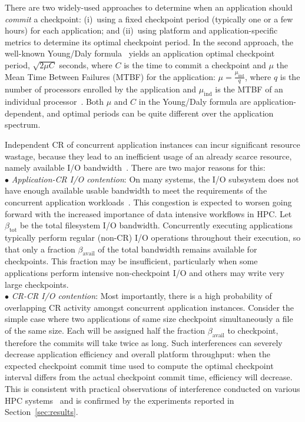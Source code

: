 \documentclass[conference,nofonttune]{IEEEtran}
\newcommand{\muind}{\mu_{\text{ind}}}
\newcommand{\bandtotal}{\beta_{\text{tot}}}
\newcommand{\bandavail}{\beta_{\text{avail}}}
\begin{document}
There are two widely-used approaches to determine when an application should
\emph{commit} a checkpoint: (i)~using a fixed checkpoint period (typically one
or a few hours) for each application; and (ii)~using platform and
application-specific metrics to determine its optimal checkpoint period. In the
second approach, the well-known Young/Daly formula~\cite{young74,daly04} yields
an application optimal checkpoint period, $\sqrt{2 \mu C}$ seconds, where $C$
is the time to commit a checkpoint and $\mu$ the Mean Time Between
Failures (MTBF) for the application: $\mu = \frac{\muind}{q}$,
where $q$ is the number of processors enrolled by the application and $\muind$
is the MTBF of an individual processor~\cite{springer-monograph}.
Both $\mu$ and $C$ in the Young/Daly formula are application-dependent, and
optimal periods can be quite different over the application spectrum.

Independent CR of concurrent application instances can incur significant
resource wastage, because they lead to an inefficient usage of an already
scarce resource, namely available I/O bandwidth~\cite{Luu:2015:Multiplatform}.
There are two major reasons for this:\\
$\bullet$ \emph{Application-CR I/O contention}: On many systems, the I/O subsystem
does not have enough available usable bandwidth to meet the requirements of the
concurrent application workloads~\cite{Luu:2015:Multiplatform}. This congestion
is expected to worsen going forward with the increased importance of data
intensive workflows in HPC.  Let $\bandtotal$ be the total filesystem I/O
bandwidth.  Concurrently executing applications typically perform regular
(non-CR) I/O operations throughout their execution, so that only a fraction
$\bandavail$ of the total bandwidth remains available for checkpoints.  This
fraction may be insufficient, particularly when some applications perform
intensive non-checkpoint I/O and others may write very large checkpoints.\\
$\bullet$ \emph{CR-CR I/O contention}: Most importantly, there is a
high probability of overlapping CR activity amongst concurrent
application instances.  Consider the simple case where two
applications of same size checkpoint simultaneously a file of the same
size. Each will be assigned half the fraction $\bandavail$ to
checkpoint, therefore the commits will take twice as long. Such
interferences can severely decrease application efficiency and overall
platform throughput: when the expected checkpoint commit time
  used to compute the optimal checkpoint interval differs from the
  actual checkpoint commit time, efficiency will decrease. This is
consistent with practical observations of interference conducted on
various HPC systems~\cite{Yildiz2016,MubarakCJLJSRCB17}
and is confirmed by the experiments reported in Section~\ref{sec:results}.
\end{document}
